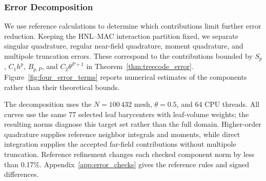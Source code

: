 \documentclass[a4paper,pdflatex,sn-mathphys-num]{sn-jnl}
\theoremstyle{thmstyleone}
\begin{document}
\subsubsection{Error Decomposition}
\label{sec:error_validation}

We use reference calculations to determine which contributions limit further error reduction. Keeping the HNL--MAC interaction partition fixed, we separate singular quadrature, regular near-field quadrature, moment quadrature, and multipole truncation errors. These correspond to the contributions bounded by $S_p$, $C_1h^p$, $B_{p,P}$, and $C_2\theta^{P+1}$ in Theorem~\ref{thm:treecode_error}. Figure~\ref{fig:four_error_terms} reports numerical estimates of the components rather than their theoretical bounds.

The decomposition uses the $N=100\,432$ mesh, $\theta=0.5$, and 64 CPU threads. All curves use the same 77 selected leaf barycenters with leaf-volume weights; the resulting norms diagnose this target set rather than the full domain. Higher-order quadrature supplies reference neighbor integrals and moments, while direct integration supplies the accepted far-field contributions without multipole truncation. Reference refinement changes each checked component norm by less than 0.17\%. Appendix~\ref{app:error_checks} gives the reference rules and signed differences.
\end{document}
